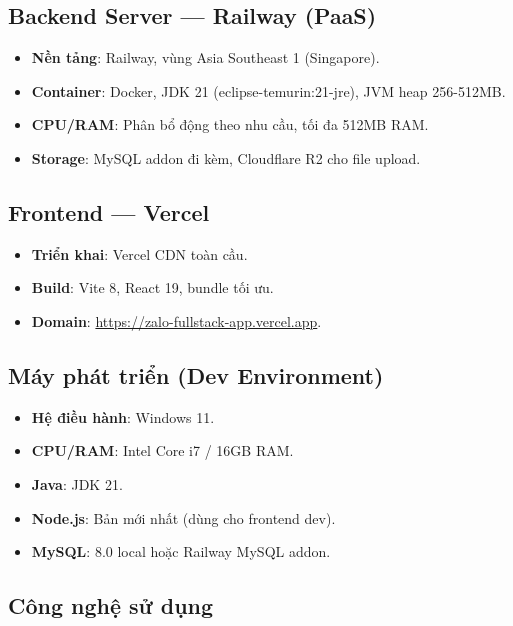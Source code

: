 \documentclass[12pt,a4paper]{report}
\begin{document}
\subsection{Backend Server --- Railway (PaaS)}

\begin{itemize}
    \item \textbf{Nền tảng}: Railway, vùng Asia Southeast 1 (Singapore).
    \item \textbf{Container}: Docker, JDK 21 (eclipse-temurin:21-jre), JVM heap 256-512MB.
    \item \textbf{CPU/RAM}: Phân bổ động theo nhu cầu, tối đa 512MB RAM.
    \item \textbf{Storage}: MySQL addon đi kèm, Cloudflare R2 cho file upload.
\end{itemize}

\subsection{Frontend --- Vercel}

\begin{itemize}
    \item \textbf{Triển khai}: Vercel CDN toàn cầu.
    \item \textbf{Build}: Vite 8, React 19, bundle tối ưu.
    \item \textbf{Domain}: \url{https://zalo-fullstack-app.vercel.app}.
\end{itemize}

\subsection{Máy phát triển (Dev Environment)}

\begin{itemize}
    \item \textbf{Hệ điều hành}: Windows 11.
    \item \textbf{CPU/RAM}: Intel Core i7 / 16GB RAM.
    \item \textbf{Java}: JDK 21.
    \item \textbf{Node.js}: Bản mới nhất (dùng cho frontend dev).
    \item \textbf{MySQL}: 8.0 local hoặc Railway MySQL addon.
\end{itemize}

\subsection{Công nghệ sử dụng}
\end{document}
